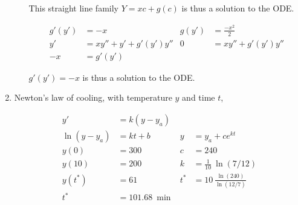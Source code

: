 \begin{enumerate}
\begin{enumerate}
                    This straight line family $ Y = xc + g(c) $ is thus a solution to the ODE.

                    \begin{align}
                        g'(y') & = -x                   & g(y') & = \frac{-x^{2}}{2} \\
                        y'     & = xy'' + y' +g'(y')y'' & 0     & = xy'' + g'(y')y'' \\
                        -x     & = g'(y')
                    \end{align}

                    $g'(y') = -x$ is thus a solution to the ODE.
          \end{enumerate}

    \item Newton's law of cooling, with temperature $ y $ and time $ t $,

          \begin{align}
              y'              & = k(y - y_{a})                     \\
              \ln (y - y_{a}) & = kt + b                         &
              y               & = y_{a} + ce^{kt}                  \\
              y(0)            & = 300                            &
              c               & = 240                              \\
              y(10)           & = 200                            &
              k               & = \frac{1}{10}\ \ln (7/12)         \\
              y(t^{*})        & = 61                             &
              t^{*}           & = 10\ \frac{\ln(240)}{\ln(12/7)}   \\
              t^{*}           & = \SI{101.68}{\min}
          \end{align}

          \begin{figure}[H]
              \centering
          \end{figure}


\end{enumerate}
